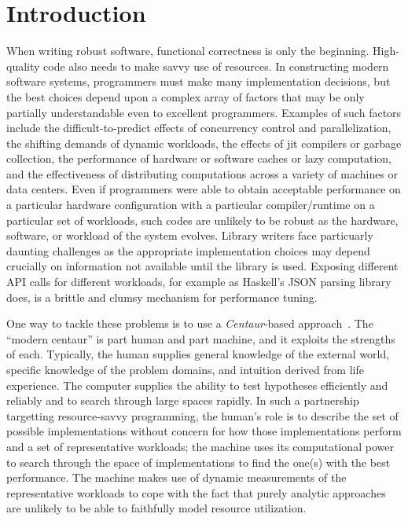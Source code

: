 



\section{Introduction}
When writing robust software, functional correctness is only the
beginning.
High-quality code also needs to make savvy use of resources.
In constructing modern software systems,
programmers must make many implementation decisions, but
the best choices depend upon a complex array of factors that may be
only partially understandable even to excellent programmers.
Examples of such factors include the difficult-to-predict effects of
concurrency control and parallelization,
the shifting demands of dynamic workloads,
the effects of jit compilers or garbage collection,
the performance of hardware or software caches or lazy computation, 
and the effectiveness of
distributing computations across a variety of machines or data
centers.
%
Even if programmers were able to obtain acceptable performance on a
particular hardware configuration with a particular compiler/runtime
on a particular set of workloads, such codes are unlikely to
be robust as the hardware, software, or workload of the system evolves.
%
Library writers face particuarly daunting challenges as the
appropriate implementation choices may depend crucially on information
not available until the library is used.  Exposing different API calls
for different workloads, for example as Haskell's JSON parsing library
does, is a brittle and clumsy mechanism for performance tuning.

One way to tackle these problems is to use a
\emph{Centaur}-based approach~\cite{centaur}.
The ``modern centaur'' is part human and part machine, and it exploits
the strengths of each.  Typically, the human supplies general
knowledge of the external world, specific knowledge of the problem
domains, and intuition derived from life experience.
The computer supplies the ability to test hypotheses efficiently and
reliably and to search through large spaces rapidly.
In such a partnership targetting resource-savvy programming,
the human's role is to describe the set of
possible implementations without concern for how those implementations
perform and a set of representative workloads;
the machine uses its computational power to search through
the space of implementations to find the one(s) with the best performance.
The machine makes use of dynamic measurements of the representative
workloads to cope with the fact that purely analytic approaches are
unlikely to be able to faithfully model resource utilization.


